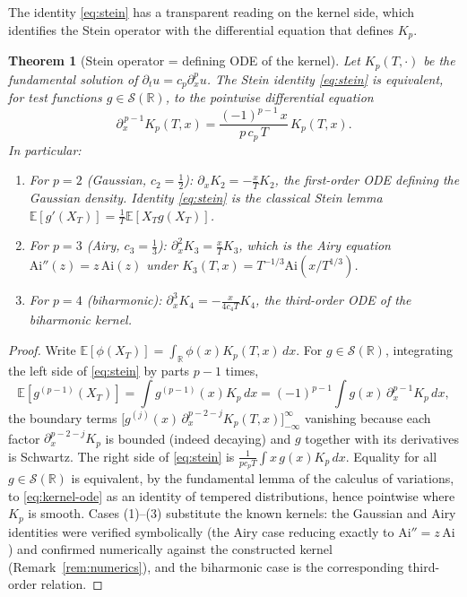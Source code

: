 \documentclass[11pt,reqno]{amsart}
\theoremstyle{plain}
\newtheorem{theorem}{Theorem}[section]
\theoremstyle{definition}
\newcommand{\E}{\mathbb{E}}
\newcommand{\R}{\mathbb{R}}
\newcommand{\Schw}{\mathcal{S}}
\begin{document}
The identity \eqref{eq:stein} has a transparent reading on the kernel side, which identifies the Stein operator with the differential equation that defines $K_p$.

\begin{theorem}[Stein operator = defining ODE of the kernel]
\label{thm:kernel-ode}
Let $K_p(T,\cdot)$ be the fundamental solution of $\partial_t u = c_p \partial_x^p u$. The Stein identity \eqref{eq:stein} is equivalent, for test functions $g \in \Schw(\R)$, to the pointwise differential equation
\begin{equation}
\label{eq:kernel-ode}
\partial_x^{\,p-1} K_p(T,x) = \frac{(-1)^{p-1}\,x}{p\, c_p\, T}\,K_p(T,x).
\end{equation}
In particular:
\begin{enumerate}
\item For $p=2$ (Gaussian, $c_2 = \tfrac12$): $\partial_x K_2 = -\frac{x}{T}K_2$, the first-order ODE defining the Gaussian density. Identity \eqref{eq:stein} is the classical Stein lemma $\E[g'(X_T)] = \frac{1}{T}\E[X_T g(X_T)]$.
\item For $p=3$ (Airy, $c_3 = \tfrac13$): $\partial_x^2 K_3 = \frac{x}{T}K_3$, which is the Airy equation $\mathrm{Ai}''(z) = z\,\mathrm{Ai}(z)$ under $K_3(T,x) = T^{-1/3}\mathrm{Ai}(x/T^{1/3})$.
\item For $p=4$ (biharmonic): $\partial_x^3 K_4 = -\frac{x}{4 c_4 T}K_4$, the third-order ODE of the biharmonic kernel.
\end{enumerate}
\end{theorem}

\begin{proof}
Write $\E[\phi(X_T)] = \int_\R \phi(x) K_p(T,x)\, dx$. For $g \in \Schw(\R)$, integrating the left side of \eqref{eq:stein} by parts $p-1$ times,
\[
\E[g^{(p-1)}(X_T)] = \int g^{(p-1)}(x) K_p\, dx = (-1)^{p-1}\int g(x)\, \partial_x^{p-1}K_p\, dx,
\]
the boundary terms $\bigl[g^{(j)}(x)\,\partial_x^{p-2-j}K_p(T,x)\bigr]_{-\infty}^{\infty}$ vanishing because each factor $\partial_x^{p-2-j}K_p$ is bounded (indeed decaying) and $g$ together with its derivatives is Schwartz. The right side of \eqref{eq:stein} is $\frac{1}{p c_p T}\int x\, g(x) K_p\, dx$. Equality for all $g \in \Schw(\R)$ is equivalent, by the fundamental lemma of the calculus of variations, to \eqref{eq:kernel-ode} as an identity of tempered distributions, hence pointwise where $K_p$ is smooth. Cases (1)--(3) substitute the known kernels: the Gaussian and Airy identities were verified symbolically (the Airy case reducing exactly to $\mathrm{Ai}'' = z\,\mathrm{Ai}$) and confirmed numerically against the constructed kernel (Remark~\ref{rem:numerics}), and the biharmonic case is the corresponding third-order relation.
\end{proof}
\end{document}
